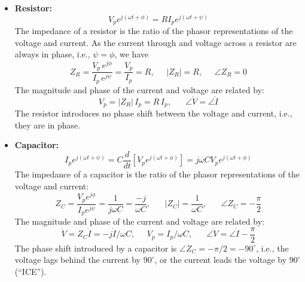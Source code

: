 \documentclass{article}
\begin{document}


\begin{itemize}
\item {\bf Resistor:} 
  \begin{equation} 
    V_pe^{j(\omega t+\phi)}=R I_pe^{j(\omega t+\psi)}
  \end{equation}
  The impedance of a resistor is the ratio of the phasor representations 
  of the voltage and current. As the current through and voltage across
  a resistor are always in phase, i.e., $\psi=\phi$, we have
  \begin{equation}
    Z_R=\frac{V_p\,e^{j\phi}}{I_p\,e^{j\psi}}
    =\frac{V_p}{I_p}=R, \;\;\;\;\; |Z_R|=R,\;\;\;\;\;\angle Z_R=0
  \end{equation}
  The magnitude and phase of the current and voltage are related by:
  \begin{equation} 
    V_p=|Z_R|\,I_p=R\,I_p,\;\;\;\;\;\; \angle\dot{V}=\angle\dot{I}
  \end{equation}
  The resistor introduces no phase shift between the voltage and current,
  i.e., they are in phase.
  
\item {\bf Capacitor:} 
  \begin{equation} 
    I_pe^{j(\omega t+\psi)}=C\frac{d}{dt}[V_p e^{j(\omega t+\phi)}]
    =j\omega C V_p e^{j(\omega t+\phi)}
  \end{equation}
  The impedance of a capacitor is the ratio of the phasor representations 
  of the voltage and current:
  \begin{equation}
    Z_C=\frac{V_pe^{j\phi}}{I_pe^{j\psi}}=\frac{1}{j\omega C}=\frac{-j}{\omega C},
    \;\;\;\;\;\;|Z_C|=\frac{1}{\omega C},\;\;\;\;\;\;\angle Z_C=-\frac{\pi}{2}
  \end{equation}
  The magnitude and phase of the current and voltage are related by:
  \begin{equation}
    \dot{V}=Z_C\dot{I}=-j\dot{I}/\omega C,\;\;\;\;\;
    V_p=I_p/\omega C,\;\;\;\;\;\; \angle\dot{V}=\angle\dot{I}-\frac{\pi}{2}
  \end{equation}
  The phase shift introduced by a capacitor is $\angle Z_C=-\pi/2=-90^\circ$,
  i.e., the voltage lags behind the current by $90^\circ$, or the current 
  leads the voltage by $90^\circ$ (``ICE'').
  


\end{itemize}
\end{document}

